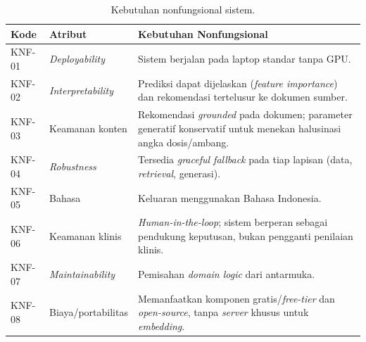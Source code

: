 \begin{table}[htbp]
\centering
\caption{Kebutuhan nonfungsional sistem.}
\label{tab:kebutuhan-nonfungsional}
\small
\begin{tabular}{@{}p{1.3cm}p{3cm}p{9cm}@{}}
\toprule
\textbf{Kode} & \textbf{Atribut} & \textbf{Kebutuhan Nonfungsional} \\
\midrule
KNF-01 & \emph{Deployability} & Sistem berjalan pada laptop standar tanpa GPU. \\[2pt]
KNF-02 & \emph{Interpretability} & Prediksi dapat dijelaskan (\emph{feature importance}) dan rekomendasi tertelusur ke dokumen sumber. \\[2pt]
KNF-03 & Keamanan konten & Rekomendasi \emph{grounded} pada dokumen; parameter generatif konservatif untuk menekan halusinasi angka dosis/ambang. \\[2pt]
KNF-04 & \emph{Robustness} & Tersedia \emph{graceful fallback} pada tiap lapisan (data, \emph{retrieval}, generasi). \\[2pt]
KNF-05 & Bahasa & Keluaran menggunakan Bahasa Indonesia. \\[2pt]
KNF-06 & Keamanan klinis & \emph{Human-in-the-loop}; sistem berperan sebagai pendukung keputusan, bukan pengganti penilaian klinis. \\[2pt]
KNF-07 & \emph{Maintainability} & Pemisahan \emph{domain logic} dari antarmuka. \\[2pt]
KNF-08 & Biaya/portabilitas & Memanfaatkan komponen gratis/\emph{free-tier} dan \emph{open-source}, tanpa \emph{server} khusus untuk \emph{embedding}. \\
\bottomrule
\end{tabular}
\end{table}
